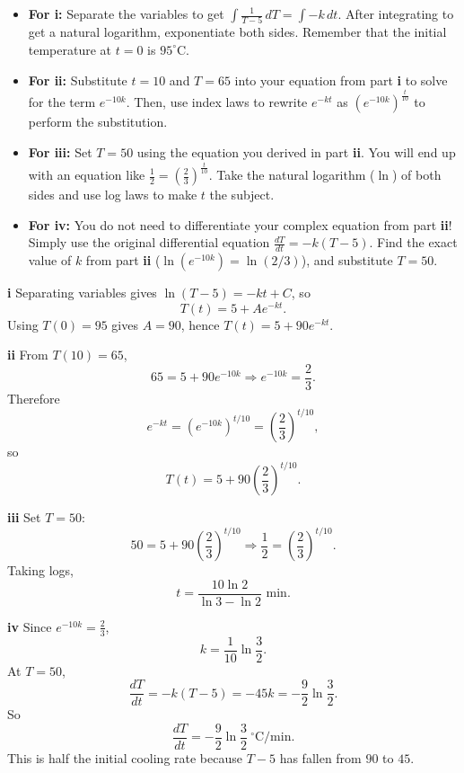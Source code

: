 \begin{hint}
\begin{itemize}
    \item \textbf{For i:} Separate the variables to get $\int \frac{1}{T-5} \, dT = \int -k \, dt$. After integrating to get a natural logarithm, exponentiate both sides. Remember that the initial temperature at $t=0$ is $95^\circ\text{C}$.
    \item \textbf{For ii:} Substitute $t=10$ and $T=65$ into your equation from part \textbf{i} to solve for the term $e^{-10k}$. Then, use index laws to rewrite $e^{-kt}$ as $(e^{-10k})^{\frac{t}{10}}$ to perform the substitution.
    \item \textbf{For iii:} Set $T=50$ using the equation you derived in part \textbf{ii}. You will end up with an equation like $\frac{1}{2} = \left(\frac{2}{3}\right)^{\frac{t}{10}}$. Take the natural logarithm ($\ln$) of both sides and use log laws to make $t$ the subject.
    \item \textbf{For iv:} You do not need to differentiate your complex equation from part \textbf{ii}! Simply use the original differential equation $\frac{dT}{dt} = -k(T-5)$. Find the exact value of $k$ from part \textbf{ii} ($\ln(e^{-10k}) = \ln(2/3)$), and substitute $T=50$.
\end{itemize}
\end{hint}

\begin{solution}
\textbf{i} Separating variables gives $\ln(T-5)=-kt+C$, so
\[
T(t)=5+Ae^{-kt}.
\]
Using $T(0)=95$ gives $A=90$, hence $\boxed{T(t)=5+90e^{-kt}}$.

\textbf{ii} From $T(10)=65$,
\[
65=5+90e^{-10k}\Rightarrow e^{-10k}=\frac23.
\]
Therefore
\[
e^{-kt}=(e^{-10k})^{t/10}=\left(\frac23\right)^{t/10},
\]
so
\[
\boxed{T(t)=5+90\left(\frac23\right)^{t/10}}.
\]

\textbf{iii} Set $T=50$:
\[
50=5+90\left(\frac23\right)^{t/10}
\Rightarrow \frac12=\left(\frac23\right)^{t/10}.
\]
Taking logs,
\[
\boxed{t=\frac{10\ln2}{\ln3-\ln2}\text{ min}}.
\]

\textbf{iv} Since $e^{-10k}=\frac23$,
\[
k=\frac{1}{10}\ln\frac32.
\]
At $T=50$,
\[
\frac{dT}{dt}=-k(T-5)=-45k=-\frac92\ln\frac32.
\]
So
\[
\boxed{\frac{dT}{dt}=-\frac92\ln\frac32\ ^\circ\text{C/min}}.
\]
This is half the initial cooling rate because $T-5$ has fallen from $90$ to $45$.
\end{solution}

